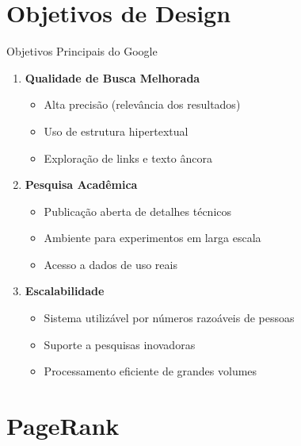 \documentclass[aspectratio=169]{beamer}
\begin{document}
\section{Objetivos de Design}

\begin{frame}{Objetivos Principais do Google}
\begin{enumerate}
\item \textbf{Qualidade de Busca Melhorada}
\begin{itemize}
\item Alta precisão (relevância dos resultados)
\item Uso de estrutura hipertextual
\item Exploração de links e texto âncora
\end{itemize}

\item \textbf{Pesquisa Acadêmica}
\begin{itemize}
\item Publicação aberta de detalhes técnicos
\item Ambiente para experimentos em larga escala
\item Acesso a dados de uso reais
\end{itemize}

\item \textbf{Escalabilidade}
\begin{itemize}
\item Sistema utilizável por números razoáveis de pessoas
\item Suporte a pesquisas inovadoras
\item Processamento eficiente de grandes volumes
\end{itemize}
\end{enumerate}
\end{frame}

\section{PageRank}
\end{document}
